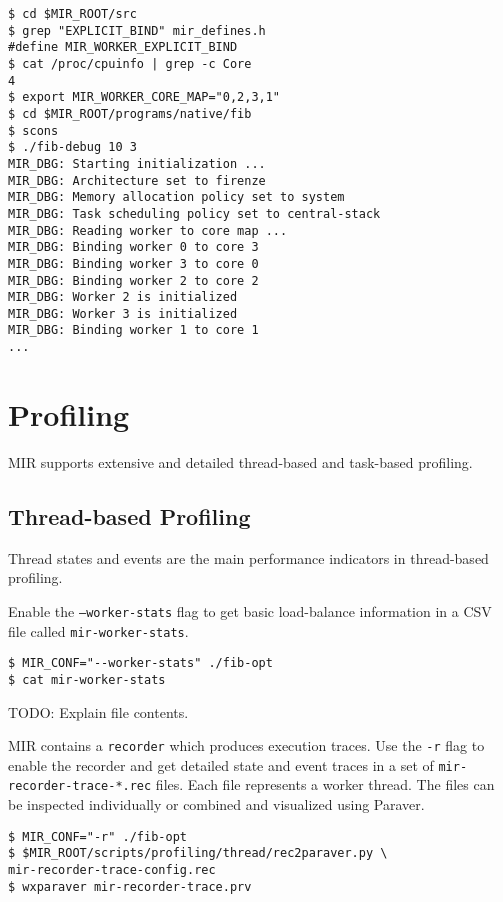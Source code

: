 \documentclass[11pt,a4paper]{article}
\begin{document}
\begin{lstlisting}[style=MyInputStyle]
$ cd $MIR_ROOT/src
$ grep "EXPLICIT_BIND" mir_defines.h
#define MIR_WORKER_EXPLICIT_BIND
$ cat /proc/cpuinfo | grep -c Core
4
$ export MIR_WORKER_CORE_MAP="0,2,3,1"
$ cd $MIR_ROOT/programs/native/fib
$ scons
$ ./fib-debug 10 3
MIR_DBG: Starting initialization ...
MIR_DBG: Architecture set to firenze
MIR_DBG: Memory allocation policy set to system
MIR_DBG: Task scheduling policy set to central-stack
MIR_DBG: Reading worker to core map ...
MIR_DBG: Binding worker 0 to core 3
MIR_DBG: Binding worker 3 to core 0
MIR_DBG: Binding worker 2 to core 2
MIR_DBG: Worker 2 is initialized
MIR_DBG: Worker 3 is initialized
MIR_DBG: Binding worker 1 to core 1
...
\end{lstlisting}

\section{Profiling}\label{profiling}

MIR supports extensive and detailed thread-based and task-based profiling.

\subsection{Thread-based Profiling}\label{thread-based-profiling}

Thread states and events are the main performance indicators in thread-based profiling.

Enable the \texttt{--worker-stats} flag to get basic load-balance information in a CSV file called \texttt{mir-worker-stats}.

\begin{lstlisting}[style=MyInputStyle]
$ MIR_CONF="--worker-stats" ./fib-opt
$ cat mir-worker-stats
\end{lstlisting}

TODO: Explain file contents.

MIR contains a \texttt{recorder} which produces execution traces. Use the \texttt{-r} flag to enable the recorder and get detailed state and event traces in a set of \texttt{mir-recorder-trace-*.rec} files.  Each file represents a worker thread. The files can be inspected individually or combined and visualized using Paraver.

\begin{lstlisting}[style=MyInputStyle]
$ MIR_CONF="-r" ./fib-opt
$ $MIR_ROOT/scripts/profiling/thread/rec2paraver.py \
mir-recorder-trace-config.rec
$ wxparaver mir-recorder-trace.prv
\end{lstlisting}
\end{document}
